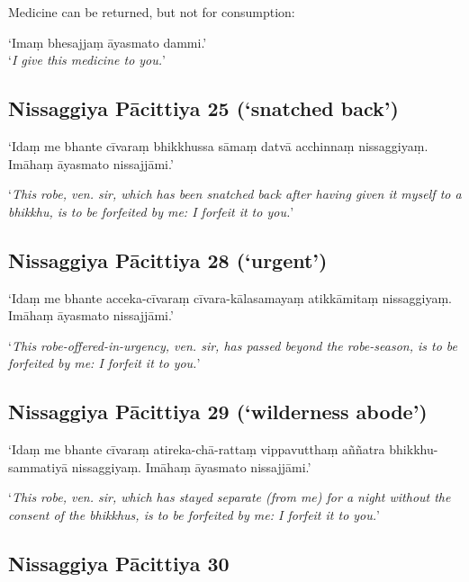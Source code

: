 Medicine can be returned, but not for consumption:

‘Imaṃ bhesajjaṃ āyasmato dammi.’\\
‘\emph{I give this medicine to you.}’ 

\subsection{Nissaggiya Pācittiya 25 (‘snatched back’)}

‘Idaṃ me bhante cīvaraṃ bhikkhussa sāmaṃ datvā acchinnaṃ nissaggiyaṃ. Imāhaṃ
āyasmato nissajjāmi.’

‘\emph{This robe, ven. sir, which has been snatched back after having given it
  myself to a bhikkhu, is to be forfeited by me: I forfeit it to you.}’



\subsection{Nissaggiya Pācittiya 28 (‘urgent’)}

‘Idaṃ me bhante acceka-cīvaraṃ cīvara-kālasamayaṃ atikkāmitaṃ nissaggiyaṃ.
Imāhaṃ āyasmato nissajjāmi.’

‘\emph{This robe-offered-in-urgency, ven. sir, has passed beyond the
  robe-season, is to be forfeited by me: I forfeit it to you.}’



\subsection{Nissaggiya Pācittiya 29 (‘wilderness abode’)}

‘Idaṃ me bhante cīvaraṃ atireka-chā-rattaṃ vippavutthaṃ aññatra
bhikkhu-sammatiyā nissaggiyaṃ. Imāhaṃ āyasmato nissajjāmi.’

‘\emph{This robe, ven. sir, which has stayed separate (from me) for a night
  without the consent of the bhikkhus, is to be forfeited by me: I forfeit it to
  you.}’



\subsection{Nissaggiya Pācittiya 30}

